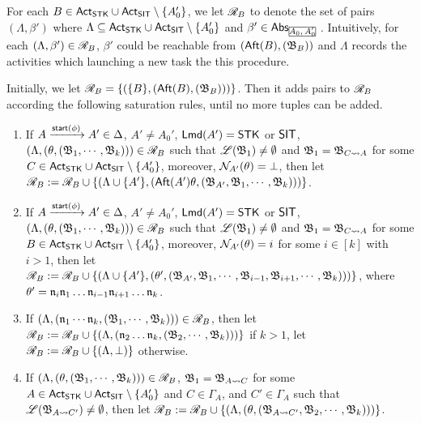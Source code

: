 For each $B\in{\sf Act}_{\mathsf{STK}}\cup{\sf Act}_{\mathsf{SIT}}\setminus\{A_0'\}$, we let $\mathscr{R}_{B}$ to denote the set of pairs $(\Lambda, \beta')$ where $\Lambda \subseteq {\sf Act}_{\mathsf{STK}}\cup{\sf Act}_{\mathsf{SIT}}\setminus\{A_0'\}$ and $\beta' \in \abs_{\mhcancel{A_0, A_0'}}$. Intuitively, for each $(\Lambda, \beta') \in \mathscr{R}_{B}$, $\beta'$ could be reachable from $({\sf Aft}(B),({\mathfrak{B} }_{B}))$ and $\Lambda$ records the activities which launching a new task the this procedure.

Initially, we let $\mathscr{R}_{B} = \{(\{B\}, ({\sf Aft}(B), ({\mathfrak{B} }_B)))\}$. Then it adds pairs to $\mathscr{R}_{B}$ according the following saturation rules, until no more tuples can be added.

\smallskip
\fbox
{
\begin{minipage}{0.9\textwidth}
\begin{enumerate}
    \item If $A \xrightarrow{{\mathsf{start} }(\phi)}A' \in\Delta$, $A'\neq A_0'$, ${\sf Lmd}(A')=\mathsf{STK}$ or ${\sf SIT}$, $(\Lambda,(\theta, ({\mathfrak{B} }_1,\cdots,{\mathfrak{B} }_k))) \in \mathscr{R}_{B}$ such that ${\mathscr{L} }({\mathfrak{B} }_1) \neq \emptyset$ and ${\mathfrak{B} }_1 = {\mathfrak{B} }_{C\rightsquigarrow A}$ for some $C \in {\sf Act}_{\sf STK}\cup{\sf Act}_{\sf SIT}\setminus\{A_0'\}$, moreover, $\mathcal{N}_{A'}(\theta) = \bot$,
    then let $\mathscr{R}_{B}: = \mathscr{R}_{B} \cup \{(\Lambda\cup\{A'\},({\sf Aft}(A')\theta, ({\mathfrak{B} }_{A'},{\mathfrak{B} }_1,\cdots,{\mathfrak{B} }_k)))\}$.
    \item If $A \xrightarrow{{\mathsf{start} }(\phi)}A' \in\Delta$, $A'\neq A_0'$, ${\sf Lmd}(A')=\mathsf{STK}$ or ${\sf SIT}$, $(\Lambda,(\theta, ({\mathfrak{B} }_1,\cdots,{\mathfrak{B} }_k))) \in \mathscr{R}_{B}$ such that ${\mathscr{L} }({\mathfrak{B} }_1) \neq \emptyset$ and ${\mathfrak{B} }_1 = {\mathfrak{B} }_{C\rightsquigarrow A}$ for some $B \in {\sf Act}_{\sf STK}\cup{\sf Act}_{\sf SIT}\setminus\{A_0'\}$, moreover, $\mathcal{N}_{A'}(\theta) = i$ for some $i \in [k]$ with $i > 1$, 
        then let $\mathscr{R}_{B}:= \mathscr{R}_{B} \cup \{(\Lambda\cup\{A'\},(\theta', ({\mathfrak{B} }_{A'}, {\mathfrak{B} }_1, \cdots,{\mathfrak{B} }_{i-1},{\mathfrak{B} }_{i+1},\cdots,{\mathfrak{B} }_{k})))\}$, where $\theta' = \mathfrak{n}_i\mathfrak{n}_1\dots\mathfrak{n}_{i-1}\mathfrak{n}_{i+1}\dots\mathfrak{n}_k$. 
    \item If $(\Lambda,(\mathfrak{n}_1 \cdots \mathfrak{n}_k, ({\mathfrak{B} }_1,\cdots,{\mathfrak{B} }_k))) \in \mathscr{R}_{B}$, then let $\mathscr{R}_{B} := \mathscr{R}_{B} \cup \{(\Lambda,(\mathfrak{n}_2\dots\mathfrak{n}_k, ({\mathfrak{B} }_2,\cdots,{\mathfrak{B} }_k)))\}$ if $k > 1$, let $\mathscr{R}_{B} := \mathscr{R}_{B} \cup \{(\Lambda,\bot)\}$ otherwise.
%
    \item If $(\Lambda,(\theta, ({\mathfrak{B} }_1,\cdots,{\mathfrak{B} }_k))) \in \mathscr{R}_{B}$, ${\mathfrak{B} }_1 = {\mathfrak{B} }_{A\rightsquigarrow C}$ for some $A\in{\sf Act}_{\mathsf{STK}}\cup{\sf Act}_{\mathsf{SIT}}\setminus\{A_0'\}$ and $C \in \Gamma_A$, and $C'  \in \Gamma_A$ such that ${\mathscr{L} }({\mathfrak{B} }_{A\rightsquigarrow C'}) \neq \emptyset$, then let 
    $\mathscr{R}_{B} := \mathscr{R}_{B} \cup \{(\Lambda,(\theta, ({\mathfrak{B} }_{A\rightsquigarrow C'}, {\mathfrak{B} }_2,\cdots,{\mathfrak{B} }_k)))\}$. 

\end{enumerate}
\end{minipage}
}

